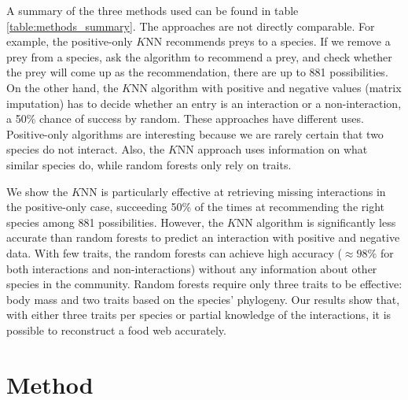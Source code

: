 \documentclass[letterpaper]{article}
\begin{document}
A summary of the three methods used can be found in table
\ref{table:methods_summary}. The approaches are not directly comparable. For
example, the positive-only $K$NN recommends preys to a species. If we remove a
prey from a species, ask the algorithm to recommend a prey, and check whether
the prey will come up as the recommendation, there are up to 881 possibilities.
On the other hand, the $K$NN algorithm with positive and negative values
(matrix imputation) has to decide whether an entry is an interaction or a
non-interaction, a 50\% chance of success by random. These approaches have
different uses. Positive-only algorithms are interesting because we are rarely
certain that two species do not interact. Also, the $K$NN approach uses
information on what similar species do, while random forests only rely
on traits.

We show the $K$NN is particularly effective at retrieving missing interactions
in the positive-only case, succeeding 50\% of the times at recommending the
right species among 881 possibilities. However, the $K$NN algorithm is
significantly less accurate than random forests to predict an interaction with
positive and negative data. With few traits, the random forests can achieve
high accuracy ($\approx98\%$ for both interactions and non-interactions)
without any information about other species in the community. Random forests
require only three traits to be effective: body mass and two traits based on
the species' phylogeny. Our results show that, with either three traits per
species or partial knowledge of the interactions, it is possible to reconstruct
a food web accurately.



\section{Method}
\end{document}
